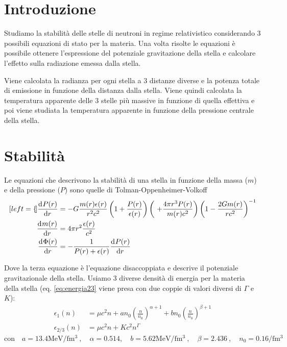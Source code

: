 \documentclass[a4paper, titlepage]{article}
\begin{document}
\tableofcontents
\newpage

\section{Introduzione}
Studiamo la stabilità delle stelle di neutroni in regime relativistico
considerando 3 possibili equazioni di stato per la materia.
Una volta risolte le equazioni è possibile ottenere l'espressione del potenziale
gravitazione della stella e calcolare l'effetto sulla radiazione emessa dalla
stella.


Viene calcolata la radianza per ogni stella a 3 distanze diverse e la potenza
totale di emissione in funzione della distanza dalla stella.
Viene quindi calcolata la temperatura apparente delle 3 stelle più massive in
funzione di quella effettiva e poi viene studiata la temperatura apparente in 
funzione della pressione centrale della stella.


\section{Stabilità}

Le equazioni che descrivono la stabilità di una stella in funzione della massa
($m$) e della pressione ($P$) sono quelle di Tolman-Oppenheimer-Volkoff
\begin{subequations}
\begin{align}[left = {\empheqlbrace}]
    \dv[]{P(r)}{r} &= - G \frac{m(r) \epsilon (r)}{r^2 c^2}
    \left(1 + \frac{P(r)}{\epsilon (r)} \right)
    \left(\ + \frac{4 \pi r^3 P(r)}{m(r) c^2} \right)
    \left(1 - \frac{2 G m(r)}{r c^2} \right)^{-1} \label{eq:P_corr} \\
    \dv[]{m(r)}{r} &= 4 \pi r^2 \frac{\epsilon (r)}{c^2} \label{eq:m_corr} \\
    \dv[]{\Phi(r)}{r} &= - \frac{1}{P(r) + \epsilon (r)} \dv[]{P(r)}{r}
    \label{eq:Phi_corr}
\end{align}
\label{eq:sistema_corr}
\end{subequations}

Dove la terza equazione è l'equazione disaccoppiata e descrive il potenziale gravitazionale della stella.
Usiamo 3 diverse densità di energia per la materia della stella (eq. \ref{eq:energia23} viene presa con due coppie di valori diversi di $\Gamma$ e $K$):
\begin{subequations}
\begin{align}
    \epsilon_1 (n) &= \mu c^2 n
    + a n_0 \left( \frac{n}{n_0} \right) ^{\alpha + 1}
    + b n_0 \left( \frac{n}{n_0} \right) ^{\beta + 1} \label{eq:energia1} \\
    \epsilon_{2/3} (n) &= \mu c^2n+Kc^2n^\Gamma \label{eq:energia23}
\end{align}
\end{subequations}
\begin{equation}
    \text{con} \quad a = 13.4 \unit{\mega\electronvolt\per\femto\cubic\meter} \ , \quad
    \alpha = 0.514, \quad
    b = 5.62 \unit{\mega\electronvolt\per\femto\cubic\meter} \ , \quad
    \beta = 2.436 \ , \quad
    n_0 = 0.16 \unit{\per\femto\cubic\meter}
\end{equation}
\end{document}
